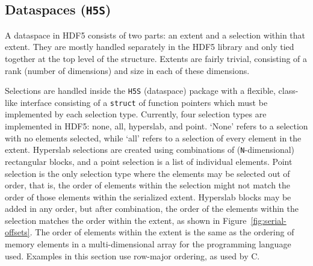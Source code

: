 \subsection{Dataspaces (\texttt{H5S})}



A dataspace in HDF5 consists of two parts: an extent and a selection within that extent. They are mostly handled separately in the HDF5 library and only tied together at the top level of the structure. Extents are fairly trivial, consisting of a rank (number of dimensions) and size in each of these dimensions.

Selections are handled inside the \texttt{H5S} (dataspace) package with a flexible, class-like interface consisting of a \texttt{struct} of function pointers which must be implemented by each selection type. Currently, four selection types are implemented in HDF5: none, all, hyperslab, and point. `None' refers to a selection with no elements selected, while `all' refers to a selection of every element in the extent. Hyperslab selections are created using combinations of (\texttt{N}-dimensional) rectangular blocks, and a point selection is a list of individual elements. Point selection is the only selection type where the elements may be selected out of order, that is, the order of elements within the selection might not match the order of those elements within the serialized extent. Hyperslab blocks may be added in any order, but after combination, the order of the elements within the selection matches the order within the extent, as shown in Figure~\ref{fig:serial-offsets}. The order of elements within the extent is the same as the ordering of memory elements in a multi-dimensional array for the programming language used. Examples in this section use row-major ordering, as used by C.

